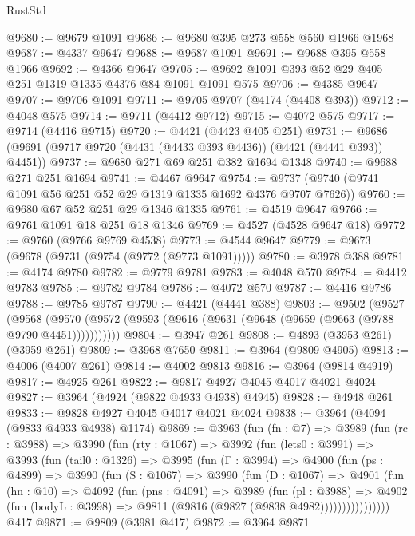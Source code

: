 \begin{lexlean}{RustStd}
\begin{coremodule}
@9680 := @9679 @1091
@9686 := @9680 @395 @273 @558 @560 @1966 @1968
@9687 := @4337 @9647
@9688 := @9687 @1091
@9691 := @9688 @395 @558 @1966
@9692 := @4366 @9647
@9705 := @9692 @1091 @393 @52 @29 @405 @251 @1319 @1335 @4376 @84 @1091 @1091 @575
@9706 := @4385 @9647
@9707 := @9706 @1091
@9711 := @9705 @9707 (@4174 (@4408 @393))
@9712 := @4048 @575
@9714 := @9711 (@4412 @9712)
@9715 := @4072 @575
@9717 := @9714 (@4416 @9715)
@9720 := @4421 (@4423 @405 @251)
@9731 := @9686 (@9691 (@9717 @9720 (@4431 (@4433 @393 @4436)) (@4421 (@4441 @393)) @4451))
@9737 := @9680 @271 @69 @251 @382 @1694 @1348
@9740 := @9688 @271 @251 @1694
@9741 := @4467 @9647
@9754 := @9737 (@9740 (@9741 @1091 @56 @251 @52 @29 @1319 @1335 @1692 @4376 @9707 @7626))
@9760 := @9680 @67 @52 @251 @29 @1346 @1335
@9761 := @4519 @9647
@9766 := @9761 @1091 @18 @251 @18 @1346
@9769 := @4527 (@4528 @9647 @18)
@9772 := @9760 (@9766 @9769 @4538)
@9773 := @4544 @9647
@9779 := @9673 (@9678 (@9731 (@9754 (@9772 (@9773 @1091)))))
@9780 := @3978 @388
@9781 := @4174 @9780
@9782 := @9779 @9781
@9783 := @4048 @570
@9784 := @4412 @9783
@9785 := @9782 @9784
@9786 := @4072 @570
@9787 := @4416 @9786
@9788 := @9785 @9787
@9790 := @4421 (@4441 @388)
@9803 := @9502
    (@9527
      (@9568 (@9570 (@9572 (@9593 (@9616 (@9631 (@9648 (@9659 (@9663 (@9788 @9790 @4451)))))))))))
@9804 := @3947 @261
@9808 := @4893 (@3953 @261) (@3959 @261)
@9809 := @3968 @7650
@9811 := @3964 (@9809 @4905)
@9813 := @4006 (@4007 @261)
@9814 := @4002 @9813
@9816 := @3964 (@9814 @4919)
@9817 := @4925 @261
@9822 := @9817 @4927 @4045 @4017 @4021 @4024
@9827 := @3964 (@4924 (@9822 @4933 @4938) @4945)
@9828 := @4948 @261
@9833 := @9828 @4927 @4045 @4017 @4021 @4024
@9838 := @3964 (@4094 (@9833 @4933 @4938) @1174)
@9869 := @3963
    (fun (fn : @7) =>
    @3989
      (fun (rc : @3988) =>
      @3990
        (fun (rty : @1067) =>
        @3992
          (fun (lets0 : @3991) =>
          @3993
            (fun (tail0 : @1326) =>
            @3995
              (fun (Γ : @3994) =>
              @4900
                (fun (ps : @4899) =>
                @3990
                  (fun (S : @1067) =>
                  @3990
                    (fun (D : @1067) =>
                    @4901
                      (fun (hn : @10) =>
                      @4092
                        (fun (pns : @4091) =>
                        @3989
                          (fun (pl : @3988) =>
                          @4902
                            (fun (bodyL : @3998) => @9811 (@9816 (@9827 (@9838 @4982))))))))))))))))
    @417
@9871 := @9809 (@3981 @417)
@9872 := @3964 @9871

\end{coremodule}
\end{lexlean}
